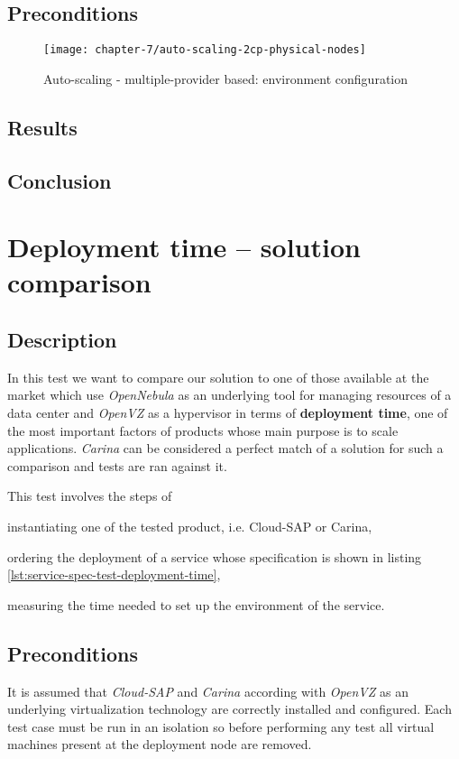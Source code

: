 \subsection*{Preconditions}
\begin{figure}[!ht]
  \begin{center}
    \texttt{[image: chapter-7/auto-scaling-2cp-physical-nodes]}
  \end{center}
  \caption{Auto-scaling - multiple-provider based: environment configuration}
  \label{eval:auto-scaling-2cp-physical-nodes}
\end{figure}

\subsection*{Results}
\subsection*{Conclusion}

\section{Deployment time -- solution comparison}
\subsection*{Description}
In this test we want to compare our solution to one of those available at the market which use \emph{OpenNebula} as an underlying tool for managing resources of a data center and \emph{OpenVZ} as a hypervisor in terms of \textbf{deployment time}, one of the most important factors of products whose main purpose is to scale applications.
\emph{Carina} \cite{Carina} can be considered a perfect match of a solution for such a comparison and tests are ran against it.

This test involves the steps of
  \begin{inparaenum}[i)]
    \item instantiating one of the tested product, i.e. Cloud-SAP or Carina,
    \item ordering the deployment of a service whose specification is shown in listing \ref{lst:service-spec-test-deployment-time},
    \item measuring the time needed to set up the environment of the service.
  \end{inparaenum}

\subsection*{Preconditions}
It is assumed that \emph{Cloud-SAP} and \emph{Carina} according with \emph{OpenVZ} as an underlying virtualization technology are correctly installed and configured.
Each test case must be run in an isolation so before performing any test all virtual machines present at the deployment node are removed.
